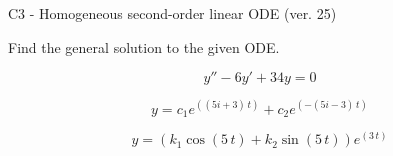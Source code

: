 \begin{exercise}
  \begin{exerciseTitle}C3 - Homogeneous second-order linear ODE (ver. 25)\end{exerciseTitle}
  \begin{exerciseStatement}
    
Find the general solution to the given ODE.

    
\[y''-6y'+34y = 0\]

  \end{exerciseStatement}
  \begin{exerciseAnswer}
    
\[y= c_{1} e^{\left(\left(5 i + 3\right) \, t\right)} + c_{2} e^{\left(-\left(5 i - 3\right) \, t\right)}\]

    
\[y= {\left(k_{1} \cos\left(5 \, t\right) + k_{2} \sin\left(5 \, t\right)\right)} e^{\left(3 \, t\right)}\]

  \end{exerciseAnswer}
\end{exercise}